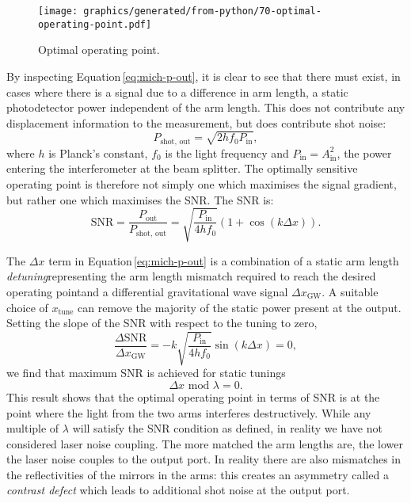 \begin{figure}
  \centering
  \texttt{[image: graphics/generated/from-python/70-optimal-operating-point.pdf]}
  \caption[Fringe]{\label{fig:optimal-operating-point}Optimal operating point.}
\end{figure}

By inspecting Equation\,\ref{eq:mich-p-out}, it is clear to see that there must exist, in cases where there is a signal due to a difference in arm length, a static photodetector power independent of the arm length. This does not contribute any displacement information to the measurement, but does contribute shot noise:
\begin{equation}
  P_{\text{shot, out}} = \sqrt{2 h f_0 P_{\text{in}}},
\end{equation}
where $h$ is Planck's constant, $f_0$ is the light frequency and $P_{\text{in}} = A_{\text{in}}^2$, the power entering the interferometer at the beam splitter. The optimally sensitive operating point is therefore not simply one which maximises the signal gradient, but rather one which maximises the \gls{SNR}. The \gls{SNR} is:
\begin{equation}
  \text{SNR} = \frac{P_{\text{out}}}{P_{\text{shot, out}}} = \sqrt{\frac{P_{\text{in}}}{4 h f_0}} \left( 1 + \cos \left(k \Delta x \right) \right).
\end{equation}

The $\Delta x$ term in Equation\,\ref{eq:mich-p-out} is a combination of a static arm length \emph{detuning}\textemdash representing the arm length mismatch required to reach the desired operating point\textemdash and a differential gravitational wave signal $\Delta x_{\text{GW}}$. A suitable choice of $ x_{\text{tune}}$ can remove the majority of the static power present at the output. Setting the slope of the \gls{SNR} with respect to the tuning to zero,
\begin{equation}
  \frac{\Delta \text{SNR}}{\Delta x_{\text{GW}}} = -k \sqrt{\frac{P_{\text{in}}}{4 h f_0}} \sin \left(k \Delta x\right) = 0,
\end{equation}
we find that maximum \gls{SNR} is achieved for static tunings 
\begin{equation}
  \Delta x \text{ mod } \lambda = 0.
\end{equation}
This result shows that the optimal operating point in terms of \gls{SNR} is at the point where the light from the two arms interferes destructively. While any multiple of $\lambda$ will satisfy the \gls{SNR} condition as defined, in reality we have not considered laser noise coupling. The more matched the arm lengths are, the lower the laser noise couples to the output port. In reality there are also mismatches in the reflectivities of the mirrors in the arms: this creates an asymmetry called a \emph{contrast defect} which leads to additional shot noise at the output port.

